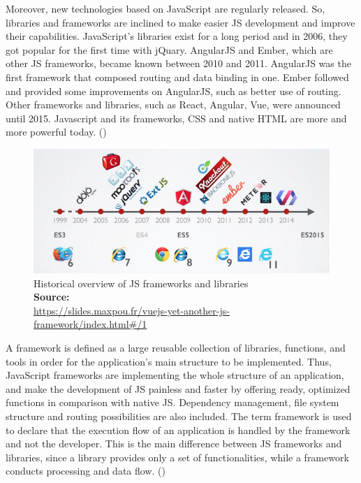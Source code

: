 Moreover, new technologies based on JavaScript are regularly released. So, libraries and frameworks are inclined to make easier JS development and improve their capabilities. JavaScript's libraries exist for a long period and in 2006, they got popular for the first time with jQuary. AngularJS and Ember, which are other JS frameworks, became known between 2010 and 2011. AngularJS was the first framework that composed routing and data binding in one. Ember followed and provided some improvements on AngularJS, such as better use of routing. Other frameworks and libraries, such as React, Angular, Vue, were announced until 2015. Javascript and its frameworks, CSS and native HTML are more and more powerful today. (\cite{Reference6}) \par

\begin{figure}[h!]
	\begin{center}
		\includegraphics[scale=0.5]{images/history-of-frameworks.png}
	\end{center}
	\caption{
		Historical overview of JS frameworks and libraries
		\\
		\textbf{Source:} \\ \url{https://slides.maxpou.fr/vuejs-yet-another-js-framework/index.html\#/1}
	}
\end{figure}

A framework is defined as a large reusable collection of libraries, functions, and tools in order for the application's main structure to be implemented. Thus, JavaScript frameworks are implementing the whole structure of an application, and make the development of JS painless and faster by offering ready, optimized functions in comparison with native JS. Dependency management, file system structure and routing possibilities are also included. The term framework is used to declare that the execution flow of an application is handled by the framework and not the developer. This is the main difference between JS frameworks and libraries, since a library provides only a set of functionalities, while a framework conducts processing and data flow. (\cite{Reference6}) \par


